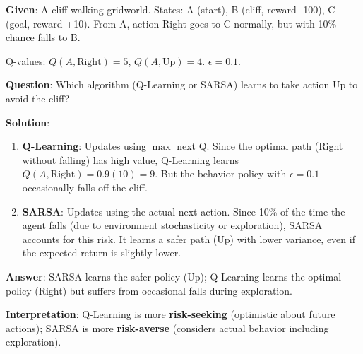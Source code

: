 \documentclass[11pt,a4paper]{article}
\begin{document}
\begin{tcolorbox}[colback=green!5!white,colframe=green!75!black,title=\textbf{Worked Example 38: Q-Learning vs SARSA Comparison}]
\textbf{Given}: A cliff-walking gridworld. States: A (start), B (cliff, reward -100), C (goal, reward +10). From A, action Right goes to C normally, but with 10\% chance falls to B.

\begin{center}
\end{center}

Q-values: $Q(A, \text{Right}) = 5$, $Q(A, \text{Up}) = 4$. $\epsilon = 0.1$.

\textbf{Question}: Which algorithm (Q-Learning or SARSA) learns to take action Up to avoid the cliff?

\textbf{Solution}:
\begin{enumerate}
    \item \textbf{Q-Learning}: Updates using $\max$ next Q. Since the optimal path (Right without falling) has high value, Q-Learning learns $Q(A, \text{Right}) = 0.9(10) = 9$. But the behavior policy with $\epsilon = 0.1$ occasionally falls off the cliff.
    \item \textbf{SARSA}: Updates using the actual next action. Since 10\% of the time the agent falls (due to environment stochasticity or exploration), SARSA accounts for this risk. It learns a safer path (Up) with lower variance, even if the expected return is slightly lower.
\end{enumerate}

\textbf{Answer}: SARSA learns the safer policy (Up); Q-Learning learns the optimal policy (Right) but suffers from occasional falls during exploration.

\textbf{Interpretation}: Q-Learning is more \textbf{risk-seeking} (optimistic about future actions); SARSA is more \textbf{risk-averse} (considers actual behavior including exploration).
\end{tcolorbox}
\end{document}
